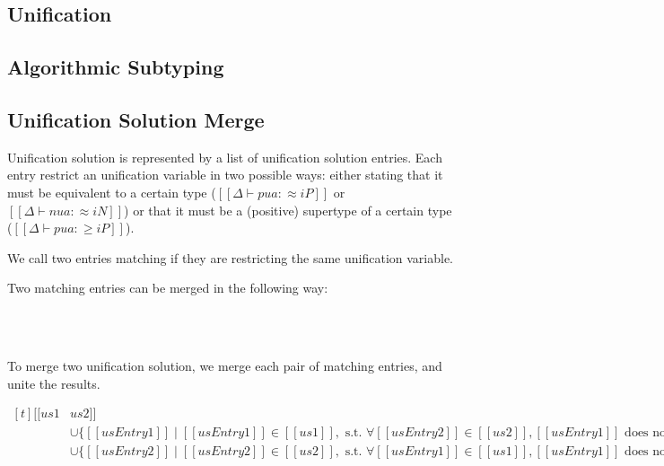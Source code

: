 \documentclass[a4,natbib=false]{article}
\begin{document}

\subsection{Unification}
\ottdefnsU

\subsection{Algorithmic Subtyping}
\ottdefnsA

\subsection{Unification Solution Merge}

Unification solution is represented by a list of unification solution entries.
Each entry restrict an unification variable in two possible ways: either stating
that it must be equivalent to a certain type ($[[Δ ⊢ pua :≈ iP]]$ or $[[Δ ⊢ nua :≈
iN]]$) or that it must be a (positive) supertype of a certain type ($[[Δ ⊢ pua :≥
iP]]$).

\begin{definition} 
  We call two entries matching if they are restricting the same unification variable.
\end{definition}

Two matching entries can be merged in the following way:
\begin{definition} \hfill \\
\ottdefnSME\\
\end{definition}


To merge two unification solution, we merge each pair of
matching entries, and unite the results.

\begin{definition}
  $\begin{aligned}[t]
  [[us1 & us2]] &= \{ [[usEntry1 & usEntry2]] \mid [[usEntry1]] \in [[us1]],
  [[usEntry2]]  \in [[us2]], \text{s.t. } [[usEntry1]] \text{ matches with }
                                   [[usEntry2]] \}\\
                &\cup
                                     \{ [[usEntry1]] \mid [[usEntry1]] \in
                                     [[us1]], \text{ s.t. }
                                     \forall [[usEntry2]]  \in [[us2]],
                                     [[usEntry1]] \text{ does not match with }
                                                     [[usEntry2]] \}\\
        &\cup
          \{ [[usEntry2]] \mid [[usEntry2]] \in
          [[us2]], \text{ s.t. }
          \forall [[usEntry1]]  \in [[us1]],
          [[usEntry1]] \text{ does not match with }
          [[usEntry2]] \}\\
   \end{aligned}$
\end{definition}
\end{document}
